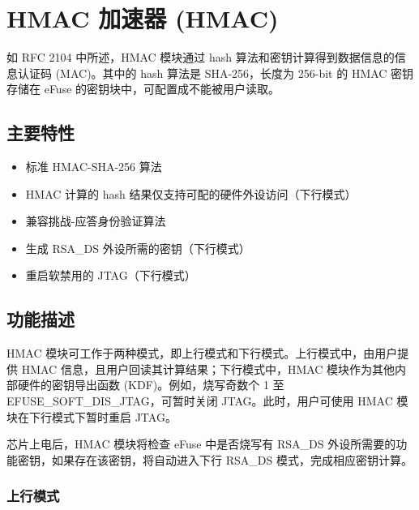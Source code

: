 \documentclass[main\_\_CN.tex]{subfiles}
\begin{document}

\ifglobal
\else
    {\let\clearpage\relax \listoftodos}
    \tableofcontents
\fi




\chapter{HMAC 加速器 (HMAC)}
\label{mod:hmac}
\hypertarget{hmac}{}

如 RFC 2104 中所述，HMAC 模块通过 hash 算法和密钥计算得到数据信息的信息认证码 (MAC)。其中的 hash 算法是 SHA-256，长度为 256-bit 的 HMAC 密钥存储在 eFuse 的密钥块中，可配置成不能被用户读取。

\section{主要特性}
\begin{itemize}
    \item 标准 HMAC-SHA-256 算法
    \item HMAC 计算的 hash 结果仅支持可配的硬件外设访问（下行模式）
    \item 兼容挑战-应答身份验证算法
    \item 生成 RSA\_DS 外设所需的密钥（下行模式）
    \item 重启软禁用的 JTAG（下行模式）
\end{itemize}


\section{功能描述}
HMAC 模块可工作于两种模式，即上行模式和下行模式。上行模式中，由用户提供 HMAC 信息，且用户回读其计算结果；下行模式中，HMAC 模块作为其他内部硬件的密钥导出函数 (KDF)。例如，烧写奇数个 1 至 EFUSE\_SOFT\_DIS\_JTAG，可暂时关闭 JTAG。此时，用户可使用 HMAC 模块在下行模式下暂时重启 JTAG。

芯片上电后，HMAC 模块将检查 eFuse 中是否烧写有 RSA\_DS 外设所需要的功能密钥，如果存在该密钥，将自动进入下行 RSA\_DS 模式，完成相应密钥计算。

\subsection{上行模式}
\end{document}
